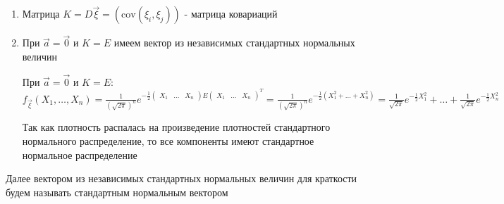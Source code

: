 \documentclass[12pt]{article}
\begin{document}
\begin{enumerate}
    \item Матрица $K = D \vec \xi = \left(\mathrm{cov} (\xi_i, \xi_j)\right)$ - матрица ковариаций

    \item При $\vec a = \vec 0$ и $K = E$ имеем вектор из независимых стандартных нормальных величин

    \begin{MyProof}
        При $\vec a = \vec 0$ и $K = E$: $f_{\vec \xi} (X_1, \dots, X_n) = \frac{1}{\left(\sqrt{2\pi}\right)^n} 
        e^{-\frac{1}{2} \begin{pmatrix}X_1 & \dots & X_n\end{pmatrix} E \begin{pmatrix}X_1 & \dots & X_n\end{pmatrix}^T} = 
        \frac{1}{\left(\sqrt{2\pi}\right)^n} e^{-\frac{1}{2} (X_1^2 + \dots + X_n^2)} = 
        \frac{1}{\sqrt{2\pi}} e^{-\frac{1}{2} X_1^2} + \dots + \frac{1}{\sqrt{2\pi}} e^{-\frac{1}{2} X_n^2}$

        Так как плотность распалась на произведение плотностей стандартного нормального распределение, то все компоненты имеют стандартное нормальное распределение
    \end{MyProof}
\end{enumerate}

Далее вектором из независимых стандартных нормальных величин для краткости будем называть стандартным нормальным вектором
\end{document}
